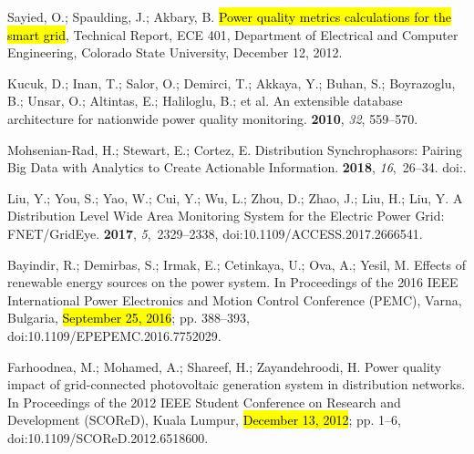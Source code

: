 \documentclass[energies,article,accept,moreauthors,pdftex]{Definitions/mdpi}
\begin{document}
\begin{thebibliography}{999}
Sayied, O.; Spaulding, J.; Akbary, B.
\newblock \hl{Power quality metrics calculations for the smart grid}, Technical Report, ECE 401, Department of Electrical and Computer Engineering, Colorado State University, December 12, 2012. %

Kucuk, D.; Inan, T.; Salor, O.; Demirci, T.; Akkaya, Y.; Buhan, S.; Boyrazoglu,
B.; Unsar, O.; Altintas, E.; Haliloglu, B.; et al.
\newblock An extensible database architecture for nationwide power quality
monitoring.
 {\bf 2010}, {\em 32},  559--570.

Mohsenian-Rad, H.; Stewart, E.; Cortez, E.
\newblock Distribution {Synchrophasors}: {Pairing} {Big} {Data} with
{Analytics} to {Create} {Actionable} {Information}.
 {\bf 2018}, {\em 16},~26--34.
\newblock
doi:{\href{https://doi.org/10.1109/MPE.2018.2790818}{}}.

Liu, Y.; You, S.; Yao, W.; Cui, Y.; Wu, L.; Zhou, D.; Zhao, J.; Liu, H.; Liu,
Y.
\newblock A {Distribution} {Level} {Wide} {Area} {Monitoring} {System} for the
{Electric} {Power} {Grid}: {FNET}/{GridEye}.
 {\bf 2017}, {\em 5},~2329--2338, doi:10.1109/ACCESS.2017.2666541.

Bayindir, R.; Demirbas, S.; Irmak, E.; Cetinkaya, U.; Ova, A.; Yesil, M.
\newblock Effects of renewable energy sources on the power system.
\newblock In {Proceedings of the } 2016 {IEEE} {International} {Power} {Electronics} and {Motion}
{Control} {Conference} ({PEMC}), Varna, Bulgaria, \hl{September 25, 2016}; pp. 388--393, doi:10.1109/EPEPEMC.2016.7752029.

Farhoodnea, M.; Mohamed, A.; Shareef, H.; Zayandehroodi, H.
\newblock Power quality impact of grid-connected photovoltaic generation system
in distribution networks.
\newblock In {Proceedings of the } 2012 {IEEE} {Student} {Conference} on {Research} and {Development}
({SCOReD}), Kuala Lumpur, \hl{December 13, 2012}; pp. 1--6, doi:10.1109/SCOReD.2012.6518600.


\end{thebibliography}
\end{document}

